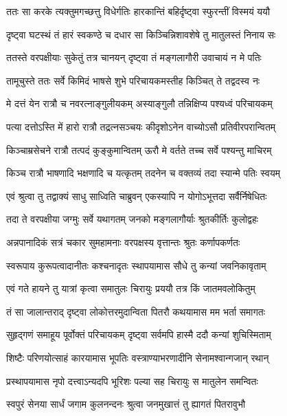 \twolineshloka
{ततः सा करके त्यक्तुमगच्छत्तु विधेर्गतिः}
{हारकान्तिं बहिर्दृष्ट्वा स्फुरन्तीं विस्मयं ययौ} %

\twolineshloka
{दृष्ट्वा घटस्थं तं हारं स्वकण्ठे च दधार सा}
{किञ्चिन्निशावशेषे तु मातुलस्तं निनाय सः} %

\twolineshloka
{ततस्ते वरपक्षीयाः सुकेतुं तत्र चानयन्}
{दृष्ट्वा तं मङ्गलागौरी उवाचायं न मे पतिः} %

\twolineshloka
{तामूचुस्ते ततः सर्वे किमिदं भाषसे शुभे}
{परिचायकमस्तीह किञ्चित् ते तद्वदस्व नः} %


\twolineshloka
{मे दत्तं येन रात्रौ च नवरत्नाङ्गुलीयकम्}
{अस्याङ्गुलौ तन्निक्षिप्य पश्यध्वं परिचायकम्} %

\twolineshloka
{पत्या दत्तोऽस्ति में हारो रात्रौ तद्रत्नसञ्चयः}
{कीदृशोऽनेन वाच्योऽसौ प्रतिवीरपरान्वितम्} %

\twolineshloka
{किञ्चाम्रसेचने रात्रौ तत्पदं कुङ्कुमान्वितम्}
{ऊरौ मे वर्तते तच्च सर्वे पश्यन्तु माचिरम्} %

\twolineshloka
{किञ्च रात्रौ भाषणादि भक्षणादि च यत्कृतम्}
{तदनेन च वक्तव्यं तदा स्यान्मे पतिः स्वयम्} %

\twolineshloka
{एवं श्रुत्वा तु तद्वाक्यं साधु साध्विति चाब्रुवन्}
{एकस्यापि न योगोऽभूत्तदा सर्वैर्निषेधितः} %

\twolineshloka
{तदा ते वरपक्षीया जग्मुः सर्वे यथागतम्}
{जनको मङ्गलागौर्याः श्रुतकीर्तिः कुलोद्वहः} %

\twolineshloka
{अन्नपानादिकं सत्रं चकार सुमहामनाः}
{वरपक्षस्य वृत्तान्तः श्रुतः कर्णापकर्णतः} %

\twolineshloka
{स्वरूपाय कुरूपत्वादानीतः कश्चनादृतः}
{स्थापयामास सौधे तु कन्यां जवनिकावृताम्} %

\twolineshloka
{एवं गते हायने तु यात्रां कृत्वा समातुलः}
{चिरायुः प्रययौ तत्र किं जातमवलोकितुम्} %

\twolineshloka
{तं सा जालान्तराद् दृष्ट्वा लोकोत्तरमुदान्विता}
{पितरौ कथयामास मम भर्ता समागतः} %

\twolineshloka
{सुहृद्गणं समाहूय पूर्वोक्तं परिचायकम्}
{दृष्ट्वा सर्वमपि हास्मै ददौ कन्यां शुचिस्मिताम्} %

\twolineshloka
{शिष्टैः परिणयोत्साहं कारयामास भूपतिः}
{वस्त्राण्याभरणादीनि सेनामश्वान्गजान् रथान्} %

\twolineshloka
{प्रस्थापयामास नृपो दत्त्वाऽन्यदपि भूरिशः}
{पल्या सह चिरायुः स मातुलेन समन्वितः} %

\twolineshloka
{स्वपुरं सेनया सार्धं जगाम कुलनन्दनः}
{श्रुत्वा जनमुखात्तं तु ह्यागतं पितरावुभौ} %

